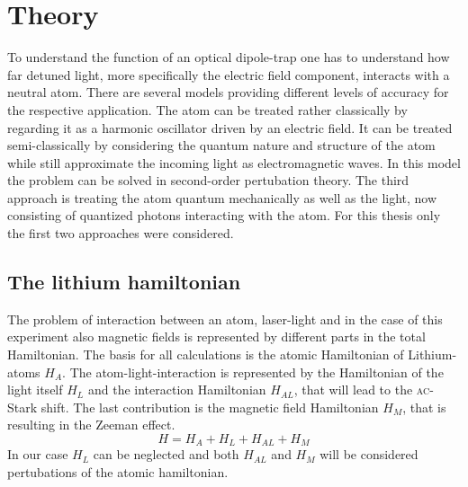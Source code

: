 \chapter{Theory}

To understand the function of an optical dipole-trap one has to understand how far detuned light, more specifically the electric field component, interacts with a neutral atom. There are several models providing different levels of accuracy for the respective application. The atom can be treated rather classically by regarding it as a harmonic oscillator driven by an electric field. It can be treated semi-classically by considering the quantum nature and structure of the atom while still approximate the incoming light as electromagnetic waves. In this model the problem can be solved in second-order pertubation theory. The third approach is treating the atom quantum mechanically as well as the light, now consisting of quantized photons interacting with the atom. For this thesis only the first two approaches were considered. 

\section{The lithium hamiltonian}

The problem of interaction between an atom, laser-light and in the case of this experiment also magnetic fields is represented by different parts in the total Hamiltonian. The basis for all calculations is the atomic Hamiltonian of Lithium-atoms $H_A$. The atom-light-interaction is represented by the Hamiltonian of the light itself $H_L$ and the interaction Hamiltonian $H_{AL}$, that will lead to the \textsc{ac}-Stark shift. The last contribution is the magnetic field Hamiltonian $H_M$, that is resulting in the Zeeman effect. 
\begin{equation}
H=H_A+H_L+H_{AL}+H_{M}
\label{Hamiltonian}
\end{equation}
In our case $H_L$ can be neglected and both $H_{AL}$ and $H_M$ will be considered pertubations of the atomic hamiltonian.

